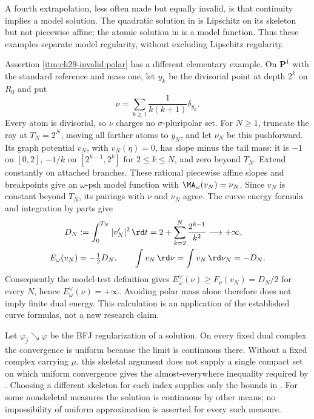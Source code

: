 A fourth extrapolation, less often made but equally invalid, is
that continuity implies a model solution.  The quadratic solution in
 is Lipschitz on its skeleton but not
piecewise affine; the atomic solution in 
is a model function.  Thus these examples separate model regularity,
without excluding Lipschitz regularity.

Assertion \cref{itm:ch29-invalid:polar} has a different elementary
example.  On $\mathbf P^1$ with the standard reference and mass one,
let $y_k$ be the divisorial point at depth $2^k$ on $R_0$ and put
\[
              \nu=\sum_{k\geq1}\frac1{k(k+1)}\delta_{y_k}.
\]
Every atom is divisorial, so $\nu$ charges no $\sigma$-pluripolar set.
For $N\geq1$, truncate the ray at $T_N=2^N$, moving all farther
atoms to $y_N$, and let $\nu_N$ be this pushforward.  Its graph
potential $v_N$, with $v_N(\eta)=0$, has slope minus the tail mass:
it is $-1$ on $[0,2]$, $-1/k$ on
$[2^{k-1},2^k]$ for $2\leq k\leq N$, and zero beyond $T_N$.
Extend constantly on attached branches.  These rational piecewise
affine slopes and breakpoints give an $\omega$-psh model function
with $\MA_\omega(v_N)=\nu_N$.  Since $v_N$ is constant beyond $T_N$,
its pairings with $\nu$ and $\nu_N$ agree.  The curve energy formula
and integration by parts give
\[
 \begin{aligned}
 D_N&:=\int_0^{T_N}|v_N'|^2\,\rd t
       =2+\sum_{k=2}^N\frac{2^{k-1}}{k^2}\longrightarrow+\infty,\\
 E_\omega(v_N)&=-\tfrac12D_N,\qquad
 \int v_N\,\rd\nu=\int v_N\,\rd\nu_N=-D_N .
 \end{aligned}
\]
Consequently the model-test definition gives
$E_\omega^\vee(\nu)\geq F_\nu(v_N)=D_N/2$ for every $N$,
hence $E_\omega^\vee(\nu)=+\infty$.  Avoiding polar mass alone
therefore does not imply finite dual energy.  This calculation is an
application of the established curve formulas, not a new research claim.

\begin{example}
\label{ex:ch29-dini-localized}
Let $\varphi_j\searrow\varphi$ be the BFJ regularization of a solution.
On every fixed dual complex the convergence is uniform because the limit is
continuous there.  Without a fixed complex carrying $\mu$, this skeletal argument
does not supply a single compact set on which uniform convergence gives
the almost-everywhere inequality required by
.  Choosing a different skeleton for
each index supplies only the bounds in .
For some nonskeletal measures the solution is continuous by other means;
no impossibility of uniform approximation is asserted for every such measure.
\end{example}

